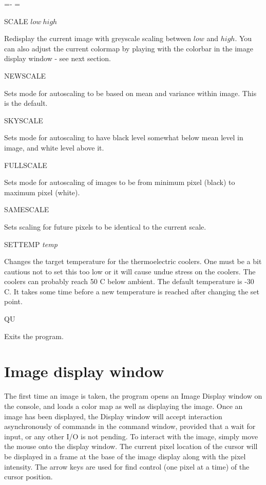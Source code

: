 \documentclass[10pt]{article}
\renewcommand{\[}{\begin{eqnarray}}
\renewcommand{\]}{\end{eqnarray}}
\newenvironment{hanging}{
        \begin{list}{}{
                \labelsep=0pt
                \labelwidth=0pt
                \listparindent=0pt
                \itemindent=-\leftmargini
                \leftmargin=\leftmargini
        }
}{
        \end{list}
}
\begin{document}
\begin{hanging}
\item{SCALE $low\ high$}

Redisplay the current image with greyscale scaling between $low$ and $high$.
You can also adjust the current colormap by playing with the colorbar in
the image display window - see next section.

\item{NEWSCALE}

Sets mode for autoscaling to be based on mean and variance within image.
This is the default.

\item{SKYSCALE}

Sets mode for autoscaling to have black level somewhat below mean level in
image, and white level above it. 

\item{FULLSCALE}

Sets mode for autoscaling of images to be from minimum pixel (black) to
maximum pixel (white).

\item{SAMESCALE}

Sets scaling for future pixels to be identical to the current scale.

\item{SETTEMP \textit{temp}}

Changes the target temperature for the thermoelectric coolers. One must
be a bit cautious not to set this too low or it will cause undue stress
on the coolers. The coolers can probably reach 50 C below ambient. The
default temperature is -30 C. It takes some time before a new temperature
is reached after changing the set point.

\item{QU}

Exits the program.

\end{hanging}

\section{Image display window}

The first time an image is taken, the program opens an Image Display
window on the console, and loads a color map as well as displaying the
image.  Once an image has been displayed, the Display window will accept
interaction asynchronously of commands in the command window,
provided that a wait for input, or any other I/O is not pending.  To
interact with the image, simply move the mouse onto the display window.
The current pixel location of the cursor will be displayed in a frame at
the base of the image display along with the pixel intensity.  The arrow
keys are used for find control (one pixel at a time) of the cursor
position.
\end{document}
